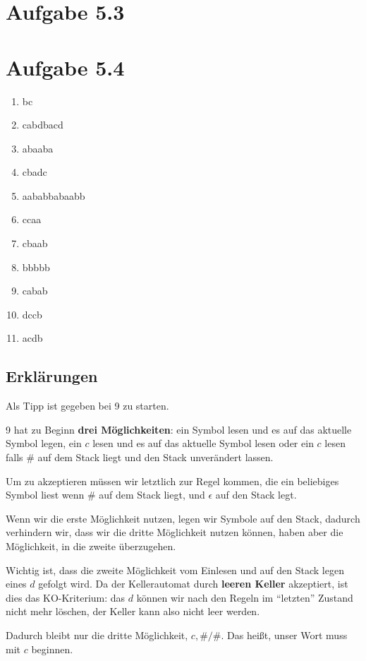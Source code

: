 \documentclass{article}
\begin{document}
\section*{Aufgabe 5.3}



\section*{Aufgabe 5.4}
\begin{enumerate}
	\item bc
	\item cabdbacd
	\item abaaba
	\item cbadc
	\item aababbabaabb
	\item ccaa
	\item cbaab
	\item bbbbb
  \item cabab
	\item dccb
  \item acdb
\end{enumerate}

\subsection*{Erklärungen}
Als Tipp ist gegeben bei 9 zu starten.

\bigskip

9 hat zu Beginn \textbf{drei Möglichkeiten}: ein Symbol lesen und es auf das aktuelle Symbol legen, ein $c$ lesen und es auf das aktuelle Symbol lesen oder ein $c$ lesen falls \# auf dem Stack liegt und den Stack unverändert lassen.

Um zu akzeptieren müssen wir letztlich zur Regel kommen, die ein beliebiges Symbol liest wenn \# auf dem Stack liegt, und $\epsilon$ auf den Stack legt.

Wenn wir die erste Möglichkeit nutzen, legen wir Symbole auf den Stack, dadurch verhindern wir, dass wir die dritte Möglichkeit nutzen können, haben aber die Möglichkeit, in die zweite überzugehen.

Wichtig ist, dass die zweite Möglichkeit vom Einlesen und auf den Stack legen eines $d$ gefolgt wird. Da der Kellerautomat durch \textbf{leeren Keller} akzeptiert, ist dies das KO-Kriterium: das $d$ können wir nach den Regeln im ``letzten'' Zustand nicht mehr löschen, der Keller kann also nicht leer werden.

Dadurch bleibt nur die dritte Möglichkeit, $c,\#/\#$. Das heißt, unser Wort muss mit $c$ beginnen.
\end{document}
